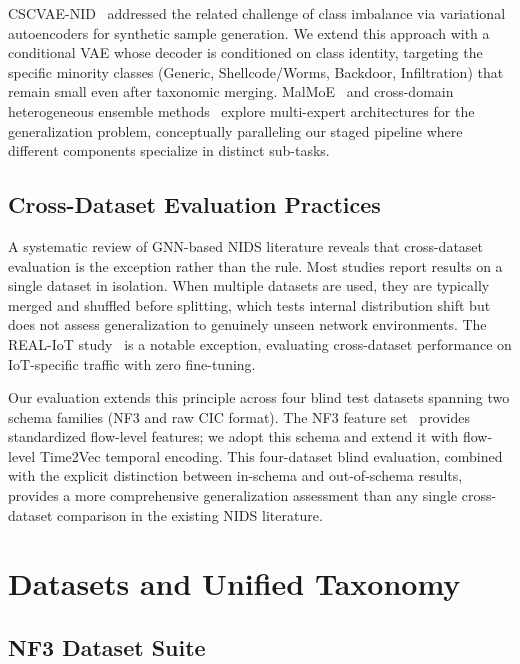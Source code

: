 \documentclass[compsoc,journal]{IEEEtran}
\begin{document}
CSCVAE-NID~\cite{cscvae} addressed the related challenge of class imbalance via variational autoencoders for synthetic sample generation. We extend this approach with a conditional VAE whose decoder is conditioned on class identity, targeting the specific minority classes (Generic, Shellcode/Worms, Backdoor, Infiltration) that remain small even after taxonomic merging. MalMoE~\cite{malmoe} and cross-domain heterogeneous ensemble methods~\cite{crossdomainensemble} explore multi-expert architectures for the generalization problem, conceptually paralleling our staged pipeline where different components specialize in distinct sub-tasks.

\subsection{Cross-Dataset Evaluation Practices}

A systematic review of GNN-based NIDS literature reveals that cross-dataset evaluation is the exception rather than the rule. Most studies report results on a single dataset in isolation. When multiple datasets are used, they are typically merged and shuffled before splitting, which tests internal distribution shift but does not assess generalization to genuinely unseen network environments. The REAL-IoT study~\cite{realiot} is a notable exception, evaluating cross-dataset performance on IoT-specific traffic with zero fine-tuning.

Our evaluation extends this principle across four blind test datasets spanning two schema families (NF3 and raw CIC format). The NF3 feature set~\cite{sarhan2021netflow} provides standardized flow-level features; we adopt this schema and extend it with flow-level Time2Vec temporal encoding. This four-dataset blind evaluation, combined with the explicit distinction between in-schema and out-of-schema results, provides a more comprehensive generalization assessment than any single cross-dataset comparison in the existing NIDS literature.

\section{Datasets and Unified Taxonomy}

\subsection{NF3 Dataset Suite}
\end{document}

